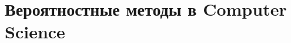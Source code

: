 \section{Вероятностные методы в Computer Science}
\label{CS}


\begin{comment}
\begin{problem}

Пять философов сидят за круглым столом. В центре стола находится чаша со
спагетти. Между каждой парой соседних философов лежит вилка. Философы чередуют размышления с приемами пищи, не отвлекаясь на второстепенные занятия. Однако
для того, чтобы вытащить спагетти из чаши и донести их до рта философу требуются
две вилки. Каждый философ может взять вилку рядом с ним (если она доступна), или положить - если он уже держит её. Если требуемая вилка занята соседом, голодный философ вынужден ждать - он не может вернуться к размышлениям, не поев. После окончания еды философ кладет обе вилки на стол.

Время одного приема пищи одним философом равномерно распределено на отрезке [0, a]. 
Время одного размышления равномерно распределено на отрезке [0, b].

Данный процесс подвержен взаимной блокировке (Dead Lock): например, если каждый возьмет по левой вилке, то начнется вечное голодание. Для избежания блокировки каждый философ кладет первую вилку, если за время t после ее взятия вторая не освободилась.

Требуется определить распределение времени t, минимизирующее среднее время ожидания после размышления и перед приемом пищи.

\end{problem}
\end{comment}

